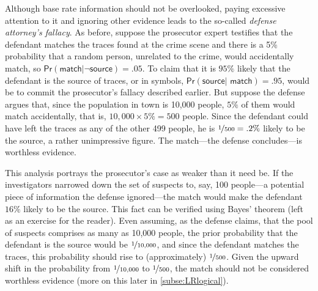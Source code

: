 \documentclass{article}
\newcommand{\pr}{\mathsf{Pr}}
\begin{document}
Although base rate information should not be overlooked, paying excessive attention to it and ignoring other evidence leads to the so-called \emph{defense attorney's fallacy}. %
As before, suppose the prosecutor expert  testifies that the defendant  matches the traces found at the crime scene and there is a 5\% probability that a random person, unrelated to the crime, would accidentally  match, so $\pr(\textsf{match}\vert \neg\textsf{source})=.05$. 
To claim that it is $95\%$ likely that the defendant is the source of traces, or in symbols, $\pr(\textsf{source}\vert \textsf{ match})=.95$, would be to commit the prosecutor's fallacy described earlier.  
But suppose the defense argues that, since the population in town is 10,000 people, $5\%$ of them would match accidentally, that is,  $10,000\times 5\%=500$ people. Since the defendant could have left the traces as any of the other 499 people, he is $\nicefrac{1}{500}=.2\%$ likely to be the source, a rather unimpressive figure. 
The match---the defense concludes---is worthless evidence.

This analysis portrays the prosecutor's case 
as weaker than it need be. 
If the investigators narrowed down the set of suspects to, say, 100 people---a potential piece of information the defense ignored---the match would make the defendant $16\%$ likely to be the source. This  fact can be verified using Bayes' theorem (left as an exercise for the reader).
Even assuming, as the defense claims, that the pool of suspects comprises as many as 10,000 people, the prior probability that the defendant is the source would be $\nicefrac{1}{10,000}$, and since the defendant matches the traces, this probability should rise to (approximately) $\nicefrac{1}{500}$.
Given the upward shift in the probability from $\nicefrac{1}{10,000}$ to $\nicefrac{1}{500}$, the  match should not be considered worthless evidence (more on this later in \ref{subse:LRlogical}).  %
%
\end{document}
